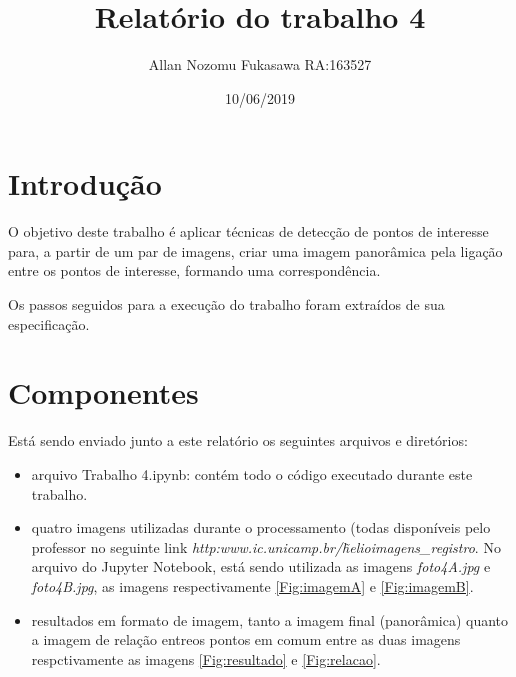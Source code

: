 \documentclass{article}
\title{Relatório do trabalho 4}
\date{10/06/2019}
\author{Allan Nozomu Fukasawa RA:163527}
\begin{document}
\maketitle

\section{Introdução}

O objetivo deste trabalho é aplicar técnicas de detecção de pontos de interesse para, a partir de um par de imagens, criar uma imagem panorâmica pela ligação entre os pontos de interesse, formando uma correspondência.

Os passos seguidos para a execução do trabalho foram extraídos de sua especificação. \cite{Helio:1}

\section{Componentes}

Está sendo enviado junto a este relatório os seguintes arquivos e diretórios:

\begin{itemize}
  \item arquivo Trabalho 4.ipynb: contém todo o código executado durante este trabalho.

  \item quatro imagens utilizadas durante o processamento (todas disponíveis pelo professor no seguinte link \textit{http:\/\/www.ic.unicamp.br/\~helio\/imagens\_registro\/}. No arquivo do Jupyter Notebook, está sendo utilizada as imagens \textit{foto4A.jpg} e \textit{foto4B.jpg}, as imagens respectivamente \ref{Fig:imagemA} e \ref{Fig:imagemB}.

  \item resultados em formato de imagem, tanto a imagem final (panorâmica) quanto a imagem de relação entreos pontos em comum entre as duas imagens respctivamente as imagens \ref{Fig:resultado} e \ref{Fig:relacao}.
\end{itemize}
\end{document}
